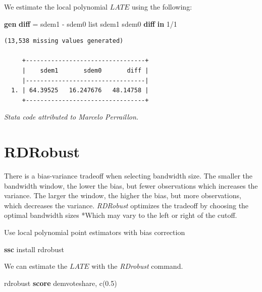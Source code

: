 \documentclass[
]{book}
\newenvironment{Shaded}{\begin{snugshade}}{\end{snugshade}}
\newcommand{\FunctionTok}[1]{\textcolor[rgb]{0.13,0.29,0.53}{\textbf{#1}}}
\newcommand{\KeywordTok}[1]{\textcolor[rgb]{0.13,0.29,0.53}{\textbf{#1}}}
\newcommand{\NormalTok}[1]{#1}
\newcommand{\OtherTok}[1]{\textcolor[rgb]{0.56,0.35,0.01}{#1}}
\begin{document}
We estimate the local polynomial \(LATE\) using the following:

\begin{Shaded}
\begin{Highlighting}[]
\KeywordTok{gen} \FunctionTok{diff}\NormalTok{ = sdem1 {-} sdem0}
\OtherTok{list}\NormalTok{ sdem1 sdem0 }\FunctionTok{diff} \KeywordTok{in}\NormalTok{ 1/1}
\end{Highlighting}
\end{Shaded}

\begin{verbatim}
(13,538 missing values generated)

     +---------------------------------+
     |    sdem1       sdem0       diff |
     |---------------------------------|
  1. | 64.39525   16.247676   48.14758 |
     +---------------------------------+
\end{verbatim}

\emph{Stata code attributed to Marcelo Perraillon.}

\chapter{RDRobust}\label{rdrobust}

There is a bias-variance tradeoff when selecting bandwidth size. The smaller the bandwidth window, the lower the bias, but fewer observations which increases the variance. The larger the window, the higher the bias, but more observations, which decreases the variance. \emph{RDRobust} optimizes the tradeoff by choosing the optimal bandwidth sizes
*Which may vary to the left or right of the cutoff.

Use local polynomial point estimators with bias correction

\begin{Shaded}
\begin{Highlighting}[]
\KeywordTok{ssc}\NormalTok{ install rdrobust}
\end{Highlighting}
\end{Shaded}

We can estimate the \(LATE\) with the \emph{RDrobust} command.

\begin{Shaded}
\begin{Highlighting}[]
\NormalTok{rdrobust }\KeywordTok{score}\NormalTok{ demvoteshare, c(0.5)}
\end{Highlighting}
\end{Shaded}
\end{document}
